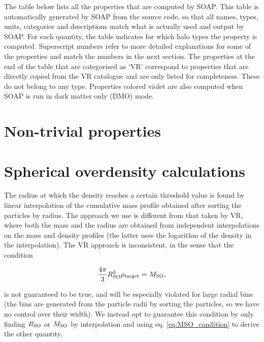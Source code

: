\documentclass{article}
\begin{document}
The table below lists all the properties that are computed by SOAP. This table is automatically generated by 
SOAP from the source code, so that all names, types, units, categories and descriptions match what is actually 
used and output by SOAP. For each quantity, the table indicates for which halo types the property is computed. 
Superscript numbers refer to more detailed explanations for some of the properties and match the numbers in 
the next section. The properties at the end of the table that are categorised as `VR' correspond to properties 
that are directly copied from the VR catalogue and are only listed for completeness. These do not belong to 
any type. Properties colored violet are also computed when SOAP is run in dark matter only (DMO) mode.



\section{Non-trivial properties}



\section{Spherical overdensity calculations}

The radius at which the density reaches a certain threshold value is found by linear interpolation of the 
cumulative mass profile obtained after sorting the particles by radius. The approach we use is different from 
that taken by VR, where both the mass and the radius are obtained from independent interpolations on the mass 
and density profiles (the latter uses the logarithm of the density in the interpolation). The VR approach is 
inconsistent, in the sense that the condition

\begin{equation}
    \frac{4\pi{}}{3} R_{\rm{}SO}^3 \rho{}_{\rm{}target} = M_{\rm{}SO},\label{eq:MSO_condition}
\end{equation}

is not guaranteed to be true, and will be especially violated for large radial bins (the bins are generated 
from the particle radii by sorting the particles, so we have no control over their width). We instead opt to 
guarantee this condition by only finding $R_{\rm{}SO}$ or $M_{\rm{}SO}$ by interpolation and using eq. 
\ref{eq:MSO_condition} to derive the other quantity.
\end{document}
